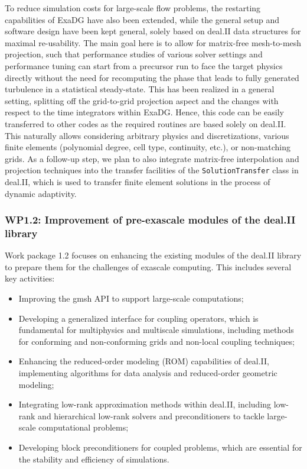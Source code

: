 \documentclass[a4paper,12pt, numbers]{article}
\begin{document}
To reduce simulation costs for large-scale flow problems, the restarting capabilities of ExaDG have also been extended, while the general setup and software design have been kept general, solely based on deal.II data structures for maximal re-usability. The main goal here is to allow for matrix-free mesh-to-mesh projection, such that performance studies of various solver settings and performance tuning can start from a precursor run to face the target physics directly without the need for recomputing the phase that leads to fully generated turbulence in a statistical steady-state. This has been realized in a general setting, splitting off the grid-to-grid projection aspect and the changes with respect to the time integrators within ExaDG. Hence, this code can be easily transferred to other codes as the required routines are based solely on deal.II. This naturally allows considering arbitrary physics and discretizations, various finite elements (polynomial degree, cell type, continuity, etc.), or non-matching grids.
As a follow-up step, we plan to also integrate matrix-free interpolation and projection techniques into the transfer facilities of the \texttt{SolutionTransfer} class in deal.II, which is used to transfer finite element solutions in the process of dynamic adaptivity.



\subsubsection*{WP1.2: Improvement of pre-exascale modules of the deal.II library} %

Work package 1.2 focuses on enhancing the existing modules of the deal.II library to prepare them for the challenges of exascale computing. This includes several key activities: 
\begin{itemize}
\item Improving the gmsh API to support large-scale computations;
\item Developing a generalized interface for coupling operators, which is fundamental for multiphysics and multiscale simulations, including methods for conforming and non-conforming grids and non-local coupling techniques;
\item Enhancing the reduced-order modeling (ROM) capabilities of deal.II, implementing algorithms for data analysis and reduced-order geometric modeling;
\item Integrating low-rank approximation methods within deal.II, including low-rank and hierarchical low-rank solvers and preconditioners to tackle large-scale computational problems;
\item Developing block preconditioners for coupled problems, which are essential for the stability and efficiency of simulations.
\end{itemize}
\end{document}
